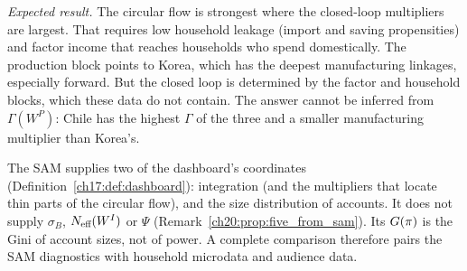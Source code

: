\documentclass[../solutions_manual.tex]{subfiles}
\begin{document}
 \emph{Expected result.} The circular flow is strongest where the closed-loop multipliers are largest. That requires low household leakage (import and saving propensities) and factor income that reaches households who spend domestically. The production block points to Korea, which has the deepest manufacturing linkages, especially forward. But the closed loop is determined by the factor and household blocks, which these data do not contain. The answer cannot be inferred from $\Gamma(W^P)$: Chile has the highest $\Gamma$ of the three and a smaller manufacturing multiplier than Korea's.

 The SAM supplies two of the dashboard's coordinates (Definition~\ref{ch17:def:dashboard}): integration (and the multipliers that locate thin parts of the circular flow), and the size distribution of accounts. It does not supply $\sigma_B$, $N_{\text{eff}}(W^I)$ or $\Psi$ (Remark~\ref{ch20:prop:five_from_sam}). Its $G(\pi)$ is the Gini of account sizes, not of power. A complete comparison therefore pairs the SAM diagnostics with household microdata and audience data.
\end{document}
